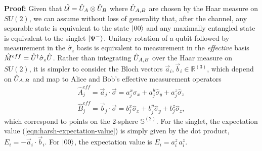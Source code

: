 \vspace{3mm}
\noindent\textbf{Proof:}
Given that $\hat{\mathcal{U}} = \hat{U}_A \otimes \hat{U}_B$ where $\hat{U}_{A,B}$ are chosen by the Haar measure on $SU(2)$, we can assume without loss of generality that, after the channel, any separable state is equivalent to the state $\mbox{$ | 00 \rangle $}$ and any maximally entangled state is equivalent to the singlet $\mbox{$ | \Psi^- \rangle $}$. Unitary rotation of a qubit followed by measurement in the $\hat{\sigma}_z$ basis is equivalent to measurement in the \emph{effective} basis $\hat{M}^{eff} = \hat{U}^\dagger \hat{\sigma}_z \hat{U}$. Rather than integrating $\hat{U}_{A,B}$ over the Haar measure on $SU(2)$, it is simpler to consider the Bloch vectors $\vec{a}_i, \vec{b}_i \in \mathbb{R}^{(3)}$, which depend on $\hat{U}_{A,B}$ and map to Alice and Bob's effective measurement operators 
\begin{align}
\hat{A}_j^{eff} = \vec{a}_j \cdot \vec{\sigma} = a_j^x \hat{\sigma}_x + a_j^y \hat{\sigma}_y + a_j^z \hat{\sigma}_z\\
\hat{B}_j^{eff} = \vec{b}_j \cdot \vec{\sigma} = b_j^x \hat{\sigma}_x + b_j^y \hat{\sigma}_y + b_j^z \hat{\sigma}_z,
\end{align}
which correspond to points on the 2-sphere $\mathbb{S}^{(2)}$. For the singlet, the expectation value (\ref{eqn:harsh-expectation-value}) is simply given by the dot product, $E_i=-\vec{a}_i \cdot \vec{b}_i$. For $\mbox{$ | 00 \rangle $}$, the expectation value is $E_i = a_i^z\, a_i^z$.



